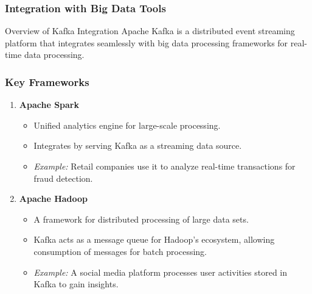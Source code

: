 \documentclass[aspectratio=169]{beamer}
\begin{document}
\begin{frame}[fragile]
    \frametitle{Integration with Big Data Tools}
    \begin{block}{Overview of Kafka Integration}
        Apache Kafka is a distributed event streaming platform that integrates seamlessly with big data processing frameworks for real-time data processing. 
    \end{block}
\end{frame}

\begin{frame}[fragile]
    \frametitle{Key Frameworks}
    \begin{enumerate}
        \item \textbf{Apache Spark}
        \begin{itemize}
            \item Unified analytics engine for large-scale processing.
            \item Integrates by serving Kafka as a streaming data source.
            \item \textit{Example:} Retail companies use it to analyze real-time transactions for fraud detection.
        \end{itemize}
        \item \textbf{Apache Hadoop}
        \begin{itemize}
            \item A framework for distributed processing of large data sets.
            \item Kafka acts as a message queue for Hadoop's ecosystem, allowing consumption of messages for batch processing.
            \item \textit{Example:} A social media platform processes user activities stored in Kafka to gain insights.
        \end{itemize}
    \end{enumerate}
\end{frame}
\end{document}
